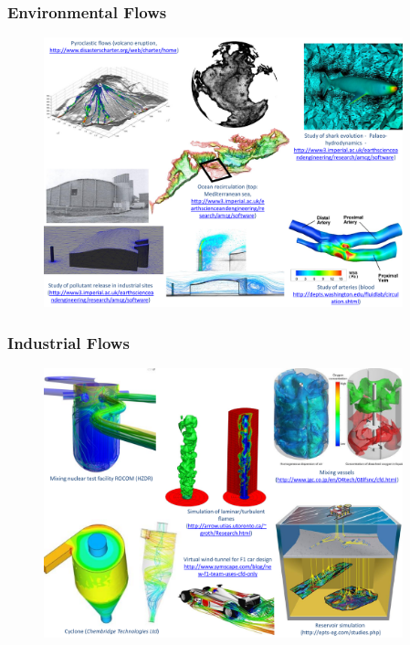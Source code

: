 \documentclass[10pt,compress]{beamer}
\begin{document}
\begin{frame}
 \frametitle{Environmental Flows} 

   \begin{figure}%
    \begin{center}
     \includegraphics[width=12.cm, height=7.8cm, clip]{./Figs/EnvironmentallApplications.pdf}
    \end{center}
   \end{figure}    

\end{frame}

\begin{frame}
 \frametitle{Industrial Flows} 

   \begin{figure}%
    \begin{center}
     \includegraphics[width=12.cm, height=7.8cm, clip]{./Figs/IndustrialApplications.pdf}
    \end{center}
   \end{figure}    

\end{frame}
\end{document}

